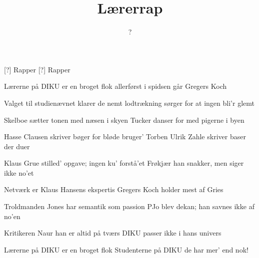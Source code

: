 \documentclass[a4paper,11pt]{article}
\title{Lærerrap}
\author{?}
\begin{document}
\maketitle

\begin{roles}
  [?] Rapper
  [?] Rapper
\end{roles}

\begin{song}
  Lærerne på DIKU er en broget flok
  allerførst i spidsen går Gregers Koch

  Valget til studienævnet klarer de nemt
  lodtrækning sørger for at ingen bli'r glemt

  Skelboe sætter tonen med næsen i skyen
  Tucker danser for med pigerne i byen

  Hasse Clausen skriver bøger for bløde bruger'
  Torben Ulrik Zahle skriver baser der duer

  Klaus Grue stilled' opgave; ingen ku' forstå'et
  Frøkjær han snakker, men siger ikke no'et

  Netværk er Klaus Hansens ekspertis
  Gregers Koch holder mest af Gries

  Troldmanden Jones har semantik som passion
  PJo blev dekan; han savnes ikke af no'en

  Kritikeren Naur han er altid på tværs
  DIKU passer ikke i hans univers

  Lærerne på DIKU er en broget flok
  Studenterne på DIKU de har mer' end nok!
\end{song}
\end{document}
